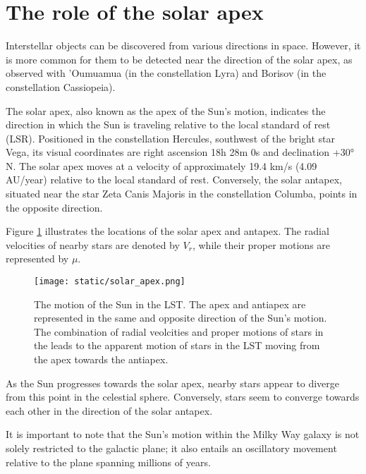 \section{The role of the solar apex}


Interstellar objects can be discovered from various directions in space.
However, it is more common for them to be detected near the direction of the
solar apex, as observed with 'Oumuamua (in the constellation Lyra) and Borisov
(in the constellation Cassiopeia).

The solar apex, also known as the apex of the Sun's motion, indicates the
direction in which the Sun is traveling relative to the local standard of rest
(LSR). Positioned in the constellation Hercules, southwest of the bright star
Vega, its visual coordinates are right ascension 18h 28m 0s and declination +30°
N. The solar apex moves at a velocity of approximately 19.4 km/s (4.09 AU/year)
relative to the local standard of rest. Conversely, the solar antapex, situated
near the star Zeta Canis Majoris in the constellation Columba, points in the
opposite direction.

Figure \ref{fig:solar_apex} illustrates the locations of the solar apex and
antapex. The radial velocities of nearby stars are denoted by $V_r$, while their
proper motions are represented by $\mu$.

\begin{figure}[H]
  \centering
  \texttt{[image: static/solar\_apex.png]}
        \caption[The motion of the Sun in the LST.]
        {
          The motion of the Sun in the LST. The apex and antiapex are
          represented in the same and opposite direction of the Sun's motion.
          The combination of radial veolcities and proper motions of stars in the
          leads to the apparent motion of stars in the LST moving from the apex
          towards the antiapex.
        }
\label{fig:solar_apex}
\end{figure}

As the Sun progresses towards the solar apex, nearby stars appear to diverge
from this point in the celestial sphere. Conversely, stars seem to converge
towards each other in the direction of the solar antapex.

It is important to note that the Sun's motion within the Milky Way galaxy is not
solely restricted to the galactic plane; it also entails an oscillatory movement
relative to the plane spanning millions of years.

